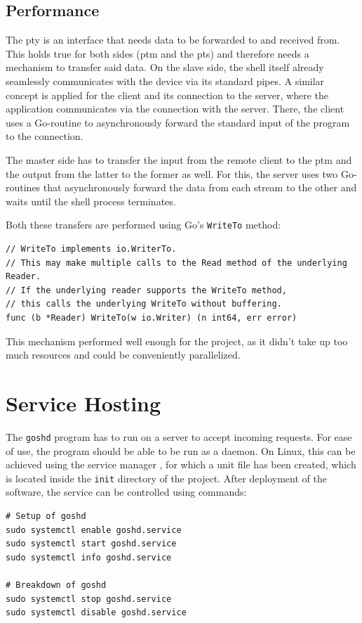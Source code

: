 \documentclass[10pt,a4paper,titlepage,twoside,english,final]{zhawreprt}
\begin{document}
\subsection{Performance}\label{ssec:Performance}
The \gls{pty} is an interface that needs data to be forwarded to and received from.
This holds true for both sides (\gls{ptm} and the \gls{pts}) and therefore needs a mechanism to transfer said data.
On the slave side, the \gls{shell} itself already seamlessly communicates with the device via its standard pipes.
A similar concept is applied for the client and its connection to the server, where the application communicates via the connection with the server.
There, the client uses a \gls{Go}-routine to asynchronously forward the standard input of the program to the connection.

The master side has to transfer the input from the remote client to the \gls{ptm} and the output from the latter to the former as well.
For this, the server uses two \gls{Go}-routines that asynchronously forward the data from each stream to the other and waits until the shell process terminates.

Both these transfers are performed using \gls{Go}'s \texttt{WriteTo} method:
\setlistingGo
\begin{lstlisting}[caption={\texttt{WriteTo} method of \gls{Go}},label=lst:GoWriteTo]
// WriteTo implements io.WriterTo.
// This may make multiple calls to the Read method of the underlying Reader.
// If the underlying reader supports the WriteTo method,
// this calls the underlying WriteTo without buffering.
func (b *Reader) WriteTo(w io.Writer) (n int64, err error)
\end{lstlisting}

This mechanism performed well enough for the project, as it didn't take up too much resources and could be conveniently parallelized.


\section{Service Hosting}\label{sec:ImplServiceHosting}
The \texttt{goshd} program has to run on a server to accept incoming requests.
For ease of use, the program should be able to be run as a \gls{daemon}.
On \gls{Linux}, this can be achieved using the service manager \cite{systemd}, for which a unit file has been created, which is located inside the \texttt{init} directory of the project.
After deployment of the software, the service can be controlled using \cite{systemd} commands:
\setlistingBash
\begin{lstlisting}[caption={\texttt{goshd} service control},label=lst:GoshdServiceCtl,deletekeywords={enable}]
# Setup of goshd
sudo systemctl enable goshd.service
sudo systemctl start goshd.service
sudo systemctl info goshd.service

# Breakdown of goshd
sudo systemctl stop goshd.service
sudo systemctl disable goshd.service
\end{lstlisting}
\end{document}

